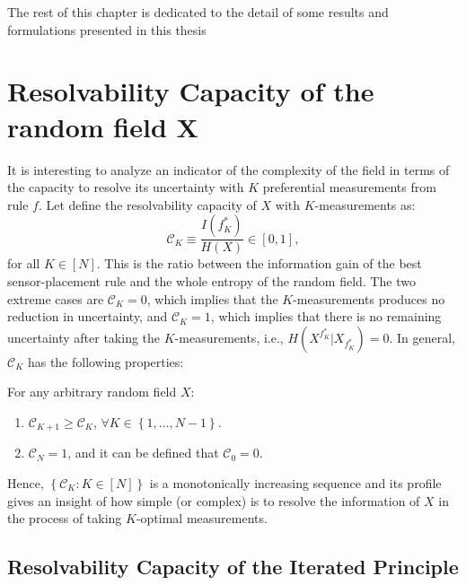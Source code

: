 \clearpage

The rest of this chapter is dedicated to the detail of some results and formulations presented in this thesis

\section{Resolvability Capacity of the random field X }
\label{APP_RC}

It is interesting to analyze an indicator of the complexity of the field in terms of the capacity to resolve its uncertainty with $K$ preferential measurements from rule $f$. Let define the resolvability capacity of $X$ with $K$-measurements as: 
\begin{equation}\label{eq:Meth_Theo_Ck}
	\mathcal{C}_{K} \equiv \frac{I(f^{*}_{K})}{H(X)} \in [0,1],  
\end{equation}
for all $K \in [N]$. This is the ratio between the information gain of the best sensor-placement rule and the whole entropy of the random field. The two extreme cases are $\mathcal{C}_{K}=0$, which implies that the $K$-measurements produces no reduction in uncertainty, and $\mathcal{C}_{K}=1$, which implies that there is no remaining uncertainty after taking the $K$-measurements, i.e., $H(X^{f^{*}_{K}}|X_{f^{*}_{K}}) = 0$. In general, $\mathcal{C}_{K}$ has the following properties:

\begin{proposition}\label{pro_resol_C} For any arbitrary random field $X$:
	\begin{enumerate}
		\item  $\mathcal{C}_{K+1} \geq  \mathcal{C}_{K}$, $\forall K \in \left\{  1, \ldots ,N -1\right\}$. 
		\item  $\mathcal{C}_{N}=1$, and it can be defined that $\mathcal{C}_{0}=0$. 
	\end{enumerate}
\end{proposition}

Hence, $\left\{ \mathcal{C}_{K}: K \in [N] \right\}$ is a monotonically increasing sequence and its profile gives an insight of how simple (or complex) is to resolve the information of $X$ in the process of taking $K$-optimal measurements. 

\subsection{Resolvability Capacity of the Iterated Principle}


